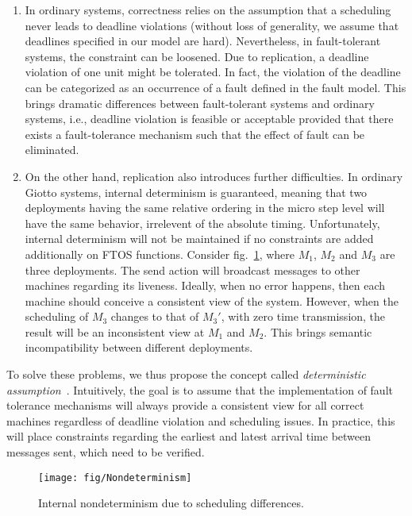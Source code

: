 \documentclass[10pt, a4paper, onecolumn, conference, compsocconf]{IEEEtran}
\begin{document}
\begin{enumerate}
\item In ordinary systems, correctness relies on the assumption that a scheduling never leads to deadline violations (without loss of generality, we assume that deadlines specified in our model are hard). Nevertheless, in fault-tolerant systems, the constraint can be loosened. Due to replication, a deadline violation of one unit might be tolerated. In fact, the violation of the deadline can be categorized as an occurrence of a fault defined in the fault model. This brings dramatic differences between fault-tolerant systems and ordinary systems, i.e., deadline violation is feasible or acceptable provided that there exists a fault-tolerance mechanism such that the effect of fault can be eliminated.
\item On the other hand, replication also introduces further difficulties. In ordinary Giotto systems, internal determinism is guaranteed, meaning that two deployments having the same relative ordering in the
micro step level will have the same behavior, irrelevent of the absolute timing. Unfortunately, internal determinism will not be maintained if
no constraints are added additionally on FTOS functions. Consider fig.~\ref{fig:Nondeterminism}, where $M_1$, $M_2$ and $M_3$ are three deployments.
The send action will broadcast messages to other machines regarding its liveness. Ideally, when no error happens, then each machine should conceive a consistent view of the system. However, when the scheduling of $M_3$ changes to that of $M_3'$, with zero time transmission, the result will be an inconsistent view at $M_1$ and $M_2$. This brings semantic incompatibility between
different deployments.
\end{enumerate}

To solve these problems, we thus propose the concept called \emph{deterministic assumption}~\cite{Cheng:2009:FTOSVerify}. Intuitively, the goal is to assume that the implementation of fault tolerance mechanisms will always provide a consistent view for all correct machines regardless of deadline violation  and scheduling issues. In practice, this will place constraints regarding the earliest and latest arrival time between messages sent, which need to be verified.

\begin{figure}
 \centering
 \texttt{[image: fig/Nondeterminism]}
 \caption{Internal nondeterminism due to scheduling differences.}
 \label{fig:Nondeterminism}
\end{figure}
\end{document}
